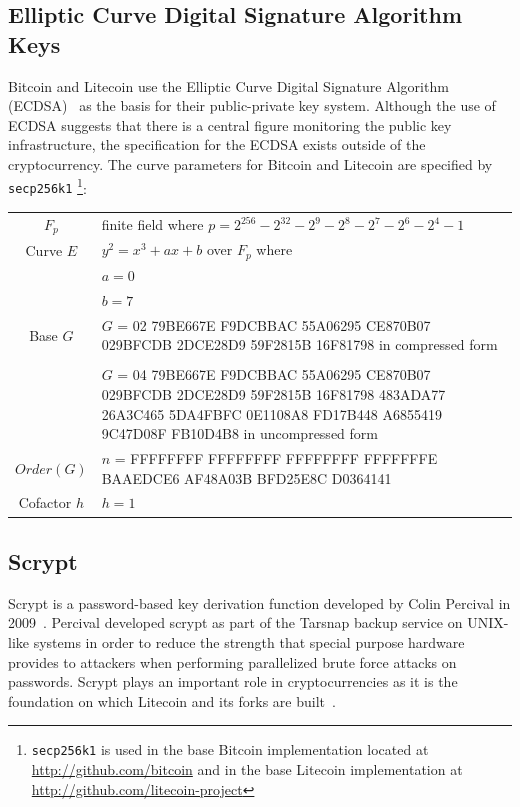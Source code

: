 \documentclass[11pt]{article}
\begin{document}
\subsection{Elliptic Curve Digital Signature Algorithm Keys}
Bitcoin and Litecoin use the Elliptic Curve Digital
Signature Algorithm (ECDSA)~\cite{johnson01} as the basis for their public-private key system. Although the use of ECDSA
suggests that there is a central figure monitoring the public key infrastructure, the specification for the ECDSA exists
outside of the cryptocurrency. The curve parameters for Bitcoin and Litecoin are specified by {\tt secp256k1} \footnote{{\tt secp256k1}
is used in the base Bitcoin implementation located at \url{http://github.com/bitcoin} and in
the base Litecoin implementation at \url{http://github.com/litecoin-project}}\cite{secg}:
\vspace{1em}\\
\begin{tabularx}{\textwidth}{cX}
    $F_p$ & finite field where $p = 2^{256} - 2^{32} - 2^9 - 2^8 - 2^7 - 2^6 - 2^4 - 1$\\
    Curve $E$ & $y^2 = x^3 + ax + b$ over $F_p$ where\\
              & $a = 0$\\
              & $b = 7$\\
    Base $G$ & $G$ = 02 79BE667E F9DCBBAC
    55A06295 CE870B07 029BFCDB 2DCE28D9 59F2815B 16F81798 in compressed form\\
    & \\ & $G$ = 04 79BE667E F9DCBBAC 55A06295 CE870B07 029BFCDB 2DCE28D9 59F2815B 16F81798 483ADA77 26A3C465 5DA4FBFC
    0E1108A8 FD17B448 A6855419 9C47D08F FB10D4B8 in uncompressed form\\
    $Order(G)$ & $n$ = FFFFFFFF FFFFFFFF FFFFFFFF FFFFFFFE BAAEDCE6 AF48A03B BFD25E8C D0364141\\
    Cofactor $h$ & $h = 1$
\end{tabularx}

\subsection{Scrypt}
Scrypt is a password-based key derivation function developed by Colin Percival in 2009~\cite{percival09}. Percival
developed scrypt as part of the Tarsnap backup service on UNIX-like systems in order to reduce the strength that special
purpose hardware provides to attackers when performing parallelized brute force attacks on passwords. Scrypt plays an
important role in cryptocurrencies as it is the foundation on which Litecoin and its forks are built~\cite{sprankel13}.
\end{document}
